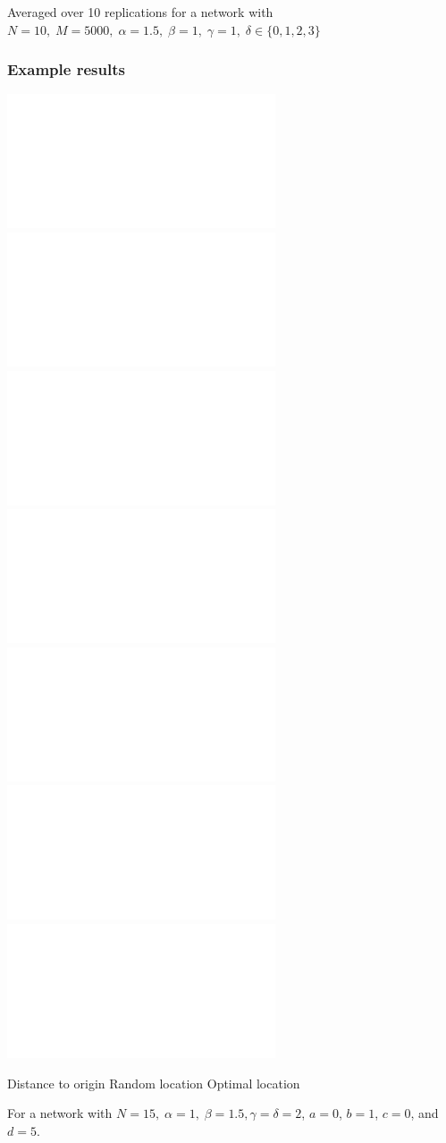 \documentclass[11pt]{beamer}
\begin{document}
\begin{frame}
\begin{center}
%

\vspace*{-.2cm}

%
%
%
%

\vspace*{.2cm}

Averaged over 10 replications for a network with $N = 10, \; M = 5000, \; \alpha = 1.5, \; \beta = 1, \; \gamma = 1, \; \delta \in \{0,1,2,3\}$
\end{center}
\end{frame}

\begin{frame}
\frametitle{Example results}
\centering
{}%
%
%

\includegraphics<1->[width=.3\textwidth]{../plots/distance-1_0-1_5-1-1.pdf}
\includegraphics<1>[width=.3\textwidth]{../plots/individual-1_0-1_5-1-1.pdf}
\includegraphics<2>[width=.3\textwidth]{../plots/individual-1_0-1_5-10-1.pdf}
\includegraphics<3>[width=.3\textwidth]{../plots/individual-1_0-1_5-100-1.pdf}
\includegraphics<1>[width=.3\textwidth]{../plots/optimal-1_0-1_5-1-1.pdf}
\includegraphics<2>[width=.3\textwidth]{../plots/optimal-1_0-1_5-10-1.pdf}
\includegraphics<3>[width=.3\textwidth]{../plots/optimal-1_0-1_5-100-1.pdf}

Distance to origin \hspace*{.6cm} Random location \hspace*{.6cm} Optimal location

\vspace*{.5cm}

For a network with $N = 15, \; \alpha = 1, \; \beta = 1.5, \gamma = \delta = 2$, $a = 0$, $b = 1$, $c = 0$, and $d = 5$.
\end{frame}
\end{document}
